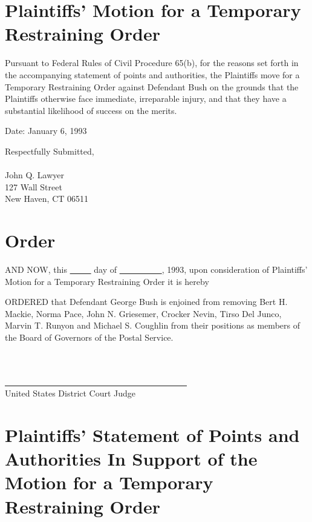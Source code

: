 \documentclass[12pt,\documentclassflag]{lawbrief}
\begin{document}
\makecaption

\section*{Plaintiffs' Motion for a Temporary Restraining Order}
\thispagestyle{empty}

Pursuant to Federal Rules of Civil Procedure 65(b), for the reasons set forth in the accompanying statement of points and authorities, the Plaintiffs move for a Temporary Restraining Order against Defendant Bush on the grounds that the Plaintiffs otherwise face immediate, irreparable injury, and that they have a substantial likelihood of success on the merits.

Date: January 6, 1993

\begin{rightbox}
Respectfully Submitted,\\
~\\
John Q. Lawyer\\
127 Wall Street\\
New Haven, CT 06511\\
\end{rightbox}
\newpage

\makecaption
\section*{Order}
\thispagestyle{empty}

AND NOW, this \underline{~~~~~} day of \underline{~~~~~~~~~~}, 1993, upon consideration of Plaintiffs' Motion for a Temporary Restraining Order it is hereby

ORDERED that Defendant George Bush is enjoined from removing Bert H. Mackie, Norma Pace, John N. Griesemer, Crocker Nevin, Tirso Del Junco, Marvin T. Runyon and Michael S. Coughlin from their positions as members of the Board of Governors of the Postal Service.

\begin{rightbox}
~\\
~\\
\underline{~~~~~~~~~~~~~~~~~~~~~~~~~~~~~~~~~~~~~~~~~~~}\\
United States District Court Judge
\end{rightbox}
\newpage

\makecaption

\section*{Plaintiffs' Statement of Points and Authorities In Support of the \\Motion for a Temporary Restraining Order}
\pagestyle{romanparen}
\thispagestyle{empty}
\newpage
\end{document}
